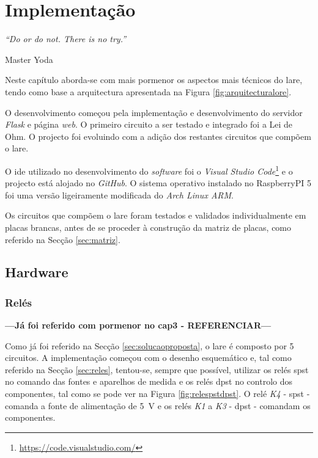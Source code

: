 \label{Capítulo4}
\chapter{Implementação}
\begin{center}
	\textit{``Do or do not. There is no try.''}

	Master Yoda
\end{center}
Neste capítulo aborda-se com mais pormenor os aspectos mais técnicos do \acrshort{lare}, tendo como base a arquitectura apresentada na Figura \ref{fig:arquitecturalore}.

O desenvolvimento começou pela implementação e desenvolvimento do servidor \textit{Flask} e página \textit{web}. O primeiro circuito a ser testado e integrado foi a Lei de Ohm. O projecto foi evoluindo com a adição dos restantes circuitos que compõem o \acrshort{lare}.

O \acrshort{ide} utilizado no desenvolvimento do \textit{software} foi o \textit{Visual Studio Code}\footnote{\url{https://code.visualstudio.com/}} e o projecto está alojado no \textit{GitHub}. O sistema operativo instalado no RaspberryPI 5 foi uma versão ligeiramente modificada do \textit{Arch Linux ARM}.

Os circuitos que compõem o \acrshort{lare} foram testados e validados individualmente em placas brancas, antes de se proceder à construção da matriz de placas, como referido na Secção \ref{sec:matriz}.

\section{Hardware}
\subsection{Relés}
\label{sec:hwreles}

\textbf{---Já foi referido com pormenor no cap3 - REFERENCIAR---}

Como já foi referido na Secção \ref{sec:solucaoproposta}, o \acrshort{lare} é composto por 5 circuitos. A implementação começou com o desenho esquemático e, tal como referido na Secção \ref{sec:reles}, tentou-se, sempre que possível, utilizar os relés \acrshort{spst} no comando das fontes e aparelhos de medida e os relés \acrshort{dpst} no controlo dos componentes, tal como se pode ver na Figura \ref{fig:relespstdpst}. O relé \textit{K4} - \acrshort{spst} - comanda a fonte de alimentação de \SI{5}{\volt} e os relés \textit{K1} a \textit{K3} - \acrshort{dpst} - comandam os componentes.

